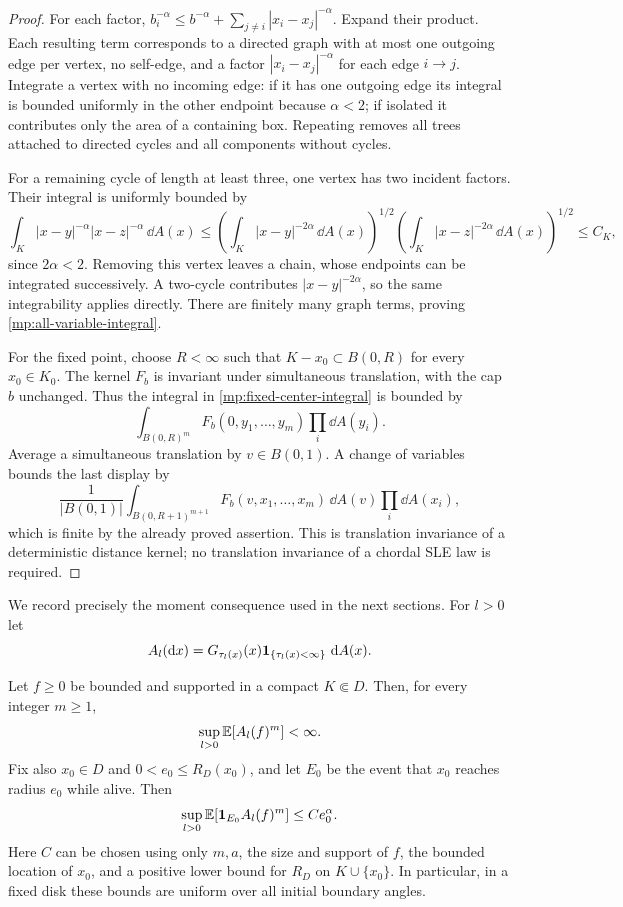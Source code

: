 \begin{proof}
For each factor,
$b_i^{-\alpha}\le b^{-\alpha}+\sum_{j\ne i}|x_i-x_j|^{-\alpha}$.
Expand their product. Each resulting term corresponds to a directed
graph with at most one outgoing edge per vertex, no self-edge, and a
factor $|x_i-x_j|^{-\alpha}$ for each edge $i\to j$.
Integrate a vertex with no incoming edge: if it has one outgoing
edge its integral is bounded uniformly in the other endpoint because
$\alpha<2$; if isolated it contributes only the area of a containing
box. Repeating removes all trees attached to directed cycles and all
components without cycles.

For a remaining cycle of length at least three, one vertex has two
incident factors. Their integral is uniformly bounded by
\[
 \int_K|x-y|^{-\alpha}|x-z|^{-\alpha}\,\dd A(x)
 \le\left(\int_K|x-y|^{-2\alpha}\,\dd A(x)\right)^{1/2}
      \left(\int_K|x-z|^{-2\alpha}\,\dd A(x)\right)^{1/2}
 \le C_K,
\]
since $2\alpha<2$. Removing this vertex leaves a chain, whose
endpoints can be integrated successively. A two-cycle contributes
$|x-y|^{-2\alpha}$, so the same integrability applies directly.
There are finitely many graph terms, proving
\eqref{mp:all-variable-integral}.

For the fixed point, choose $R<\infty$ such that
$K-x_0\subset B(0,R)$ for every $x_0\in K_0$. The kernel $F_b$ is
invariant under simultaneous translation, with the cap $b$ unchanged.
Thus the integral in \eqref{mp:fixed-center-integral} is bounded by
\[
 \int_{B(0,R)^m}F_b(0,y_1,\ldots,y_m)\prod_i\dd A(y_i).
\]
Average a simultaneous translation by $v\in B(0,1)$. A change of
variables bounds the last display by
\[
 \frac1{|B(0,1)|}
 \int_{B(0,R+1)^{m+1}}F_b(v,x_1,\ldots,x_m)
                       \,\dd A(v)\prod_i\dd A(x_i),
\]
which is finite by the already proved assertion. This is translation
invariance of a deterministic distance kernel; no translation
invariance of a chordal SLE law is required.
\end{proof}

We record precisely the moment consequence used in the next sections.
For $l>0$ let
\[
 A_l(\mathop{}\!\mathrm{d} x)=G_{\tau_l(x)}(x)
                       \mathbf 1_{\{\tau_l(x)<\infty\}}\,\mathop{}\!\mathrm{d} A(x).
\]

\begin{corollary}\label{mp:level-moments}
Let $f\ge0$ be bounded and supported in a compact $K\Subset D$.
Then, for every integer $m\ge1$,
\begin{equation}
 \sup_{l>0}\mathbb E[A_l(f)^m]<\infty.
 \label{mp:ordinary-moments}
\end{equation}
Fix also $x_0\in D$ and $0<e_0\le R_D(x_0)$, and let $E_0$ be the
event that $x_0$ reaches radius $e_0$ while alive. Then
\begin{equation}
 \sup_{l>0}\mathbb E[\mathbf 1_{E_0} A_l(f)^m]\le C e_0^\alpha.
 \label{mp:center-moments}
\end{equation}
Here $C$ can be chosen using only $m,a$, the size and support of $f$,
the bounded location of $x_0$, and a positive lower bound for
$R_D$ on $K\cup\{x_0\}$. In particular, in a fixed disk these bounds
are uniform over all initial boundary angles.
\end{corollary}

